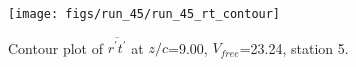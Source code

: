 \begin{figure}[H]
\centering
\texttt{[image: figs/run\_45/run\_45\_rt\_contour]}
\caption{Contour plot of $\overline{r^\prime t^\prime}$ at $z/c$=9.00, $V_{free}$=23.24, station 5.}
\label{fig:run_45_rt_contour}
\end{figure}


